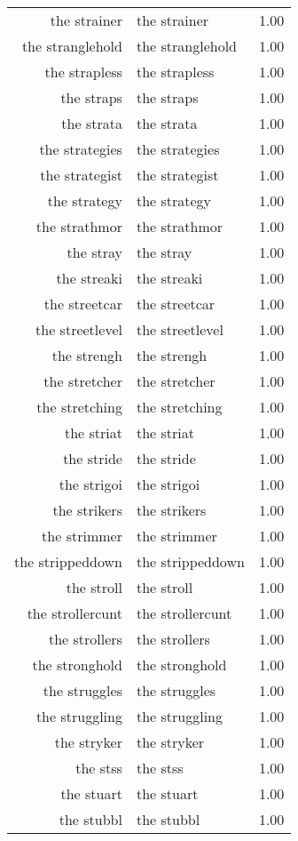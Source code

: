 \begin{table}[ht]
\begin{tabular}{rlr}
  the strainer & the strainer & 1.00 \\ 
  the stranglehold & the stranglehold & 1.00 \\ 
  the strapless & the strapless & 1.00 \\ 
  the straps & the straps & 1.00 \\ 
  the strata & the strata & 1.00 \\ 
  the strategies & the strategies & 1.00 \\ 
  the strategist & the strategist & 1.00 \\ 
  the strategy & the strategy & 1.00 \\ 
  the strathmor & the strathmor & 1.00 \\ 
  the stray & the stray & 1.00 \\ 
  the streaki & the streaki & 1.00 \\ 
  the streetcar & the streetcar & 1.00 \\ 
  the streetlevel & the streetlevel & 1.00 \\ 
  the strengh & the strengh & 1.00 \\ 
  the stretcher & the stretcher & 1.00 \\ 
  the stretching & the stretching & 1.00 \\ 
  the striat & the striat & 1.00 \\ 
  the stride & the stride & 1.00 \\ 
  the strigoi & the strigoi & 1.00 \\ 
  the strikers & the strikers & 1.00 \\ 
  the strimmer & the strimmer & 1.00 \\ 
  the strippeddown & the strippeddown & 1.00 \\ 
  the stroll & the stroll & 1.00 \\ 
  the strollercunt & the strollercunt & 1.00 \\ 
  the strollers & the strollers & 1.00 \\ 
  the stronghold & the stronghold & 1.00 \\ 
  the struggles & the struggles & 1.00 \\ 
  the struggling & the struggling & 1.00 \\ 
  the stryker & the stryker & 1.00 \\ 
  the stss & the stss & 1.00 \\ 
  the stuart & the stuart & 1.00 \\ 
  the stubbl & the stubbl & 1.00 \\ 

\end{tabular}
\end{table}
